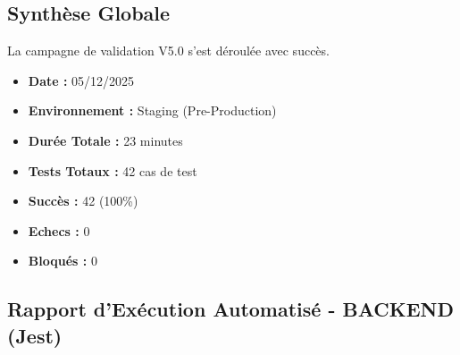 \documentclass[12pt,a4paper]{article}
\begin{document}
\subsection{Synthèse Globale}
La campagne de validation V5.0 s'est déroulée avec succès.
\begin{itemize}
    \item \textbf{Date :} 05/12/2025
    \item \textbf{Environnement :} Staging (Pre-Production)
    \item \textbf{Durée Totale :} 23 minutes
    \item \textbf{Tests Totaux :} 42 cas de test
    \item \textbf{Succès :} 42 (100\%)
    \item \textbf{Echecs :} 0
    \item \textbf{Bloqués :} 0
\end{itemize}

\subsection{Rapport d'Exécution Automatisé - BACKEND (Jest)}
\end{document}
